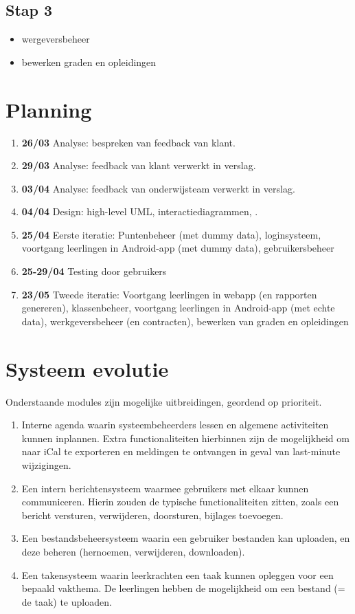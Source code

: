 \documentclass[a4paper]{article}
\begin{document}
\subsection{Stap 3}
\begin{itemize}
    \item wergeversbeheer
    \item bewerken graden en opleidingen
\end{itemize}


\section{Planning}
\begin{enumerate}
    \item \textbf{26/03} Analyse: bespreken van feedback van klant.
    \item \textbf{29/03} Analyse: feedback van klant verwerkt in verslag.
    \item \textbf{03/04} Analyse: feedback van onderwijsteam verwerkt in verslag.
    \item \textbf{04/04} Design: high-level UML, interactiediagrammen, .
    \item \textbf{25/04} Eerste iteratie: Puntenbeheer (met dummy data), loginsysteem, voortgang leerlingen in Android-app (met dummy data), gebruikersbeheer
    \item \textbf{25-29/04} Testing door gebruikers
    \item \textbf{23/05} Tweede iteratie: Voortgang leerlingen in webapp (en rapporten genereren), klassenbeheer, voortgang leerlingen in Android-app (met echte data), werkgeversbeheer (en contracten), bewerken van graden en opleidingen
\end{enumerate}


\section{Systeem evolutie}
Onderstaande modules zijn mogelijke uitbreidingen, geordend op prioriteit.
\begin{enumerate}
    \item Interne agenda waarin systeembeheerders lessen en algemene activiteiten kunnen inplannen. Extra functionaliteiten hierbinnen zijn de mogelijkheid om naar iCal te exporteren en meldingen te ontvangen in geval van last-minute wijzigingen.
    \item Een intern berichtensysteem waarmee gebruikers met elkaar kunnen communiceren. Hierin zouden de typische functionaliteiten zitten, zoals een bericht versturen, verwijderen, doorsturen, bijlages toevoegen.
    \item Een bestandsbeheersysteem waarin een gebruiker bestanden kan uploaden, en deze beheren (hernoemen, verwijderen, downloaden).
    \item Een takensysteem waarin leerkrachten een taak kunnen opleggen voor een bepaald vakthema. De leerlingen hebben de mogelijkheid om een bestand (= de taak) te uploaden.
\end{enumerate}
\end{document}
